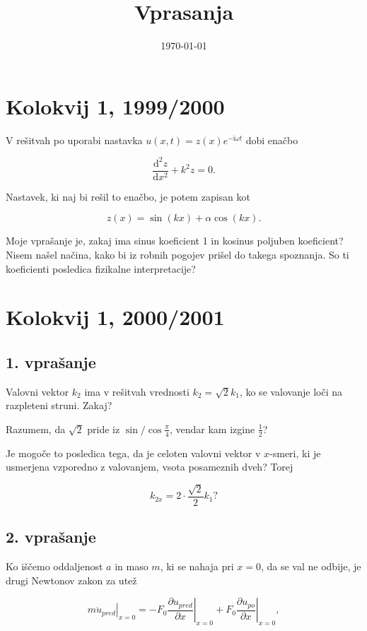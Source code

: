 \documentclass[11pt]{article}
\date{\today}
\title{Vprasanja}
\begin{document}
\maketitle
\tableofcontents

\section{Kolokvij 1, 1999/2000}
\label{sec:org072f85e}

V rešitvah po uporabi nastavka \(u(x, t) = z(x) e^{- \mathrm{i} \omega t}\) dobi enačbo

\[ \frac{\mathrm{d} ^2 z }{\mathrm{d} x ^2} + k ^2 z = 0.
\]

Nastavek, ki naj bi rešil to enačbo, je potem zapisan kot

\[ z (x) = \sin (kx) + \alpha \cos (kx).
\]

Moje vprašanje je, zakaj ima sinus koeficient 1 in kosinus poljuben koeficient? Nisem našel načina, kako bi iz robnih pogojev prišel do takega spoznanja. So ti koeficienti posledica fizikalne interpretacije?
\section{Kolokvij 1, 2000/2001}
\label{sec:org3be468d}
\subsection{1. vprašanje}
\label{sec:org2b0c815}
Valovni vektor \(k_2\) ima v rešitvah vrednosti \(k_2 = \sqrt{2} k_1\), ko se valovanje loči na razpleteni struni. Zakaj?

Razumem, da \(\sqrt{2}\) pride iz \(\sin / \cos \frac{\pi}{4}\), vendar kam izgine \(\frac{1}{2}\)?

Je mogoče to posledica tega, da je celoten valovni vektor v \(x\)-smeri, ki je usmerjena vzporedno z valovanjem, vsota posameznih dveh? Torej

\[ k_{2x} = 2 \cdot \frac{\sqrt{2}}{2} k_1?
\]
\subsection{2. vprašanje}
\label{sec:orgaca966d}

Ko iščemo oddaljenost \(a\) in maso \(m\), ki se nahaja pri \(x = 0\), da se val ne odbije, je drugi Newtonov zakon za utež

\begin{equation}
\label{eq:1}
 \left. m \ddot{u}_{pred} \right|_{x = 0} = - F_0 \left. \frac{\partial u_{pred}}{\partial x} \right|_{x = 0} + F_0 \left. \frac{\partial u_{po}}{\partial x} \right|_{x = 0},
\end{equation}
\end{document}
